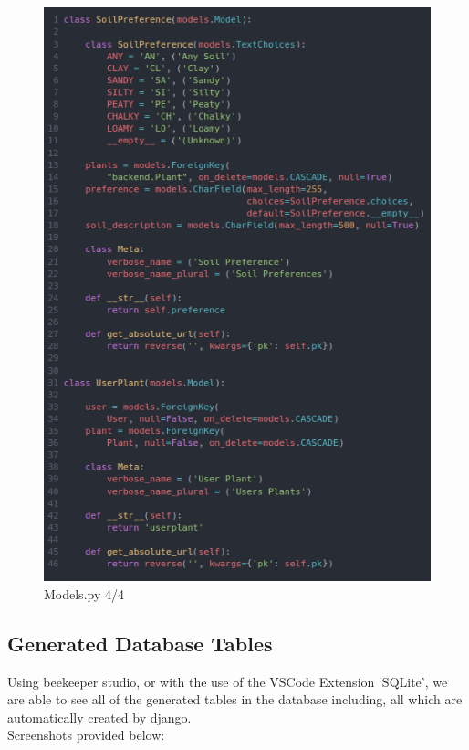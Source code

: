 \documentclass{article}
\begin{document}
    \begin{figure}
        \centering
        \caption{Models.py 4/4}
        \includegraphics{models4}
    \end{figure}

    \newpage


    \subsection{Generated Database Tables}
    Using beekeeper studio, or with the use of the VSCode Extension `SQLite', we are able to see all of the generated tables in the database including, all which are automatically created by django. \\Screenshots provided below:
\end{document}
